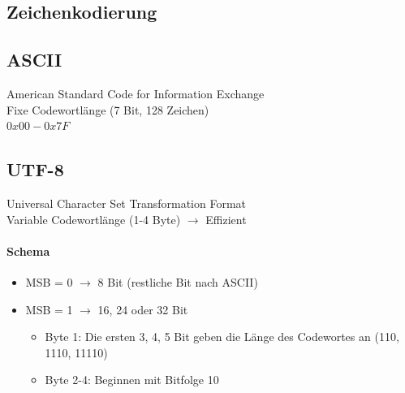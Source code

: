 \documentclass[6pt,a4paper]{scrartcl}
\begin{document}
\begin{multicols*}{3}
\section{Zeichenkodierung}
	\subsection{ASCII}
	American Standard Code for Information Exchange \\
	Fixe Codewortlänge (7 Bit, 128 Zeichen)\\
	$0x00 - 0x7F$
	\subsection{UTF-8}
	Universal Character Set Transformation Format \\
	Variable Codewortlänge (1-4 Byte) $\rightarrow$ Effizient \\
	\paragraph{Schema}
	\begin{itemize}
	\item MSB = 0 $\rightarrow$ 8 Bit (restliche Bit nach ASCII)
	\item MSB = 1 $\rightarrow$ 16, 24 oder 32 Bit
	 \begin{itemize}

	\item Byte 1: Die ersten 3, 4, 5 Bit geben die Länge des Codewortes an (110, 1110, 11110)
	\item Byte 2-4: Beginnen mit Bitfolge 10
	\end{itemize}
	\end{itemize}


\end{multicols*}
\end{document}
